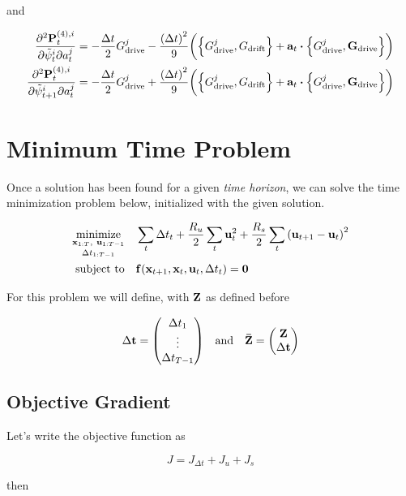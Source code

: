 \documentclass{article}
\newcommand{\isopsi}{\tilde \psi}
\begin{document}
and 

\begin{align}
  \pdv{\vb{P}_t^{(4), i}}{\isopsi_t^i}{a^j_t} &= -\frac{\Delta t}{2} G^j_{\text{drive}} - \frac{\qty(\Delta t)^2}{9}\bigg( \qty{G^j_{\text{drive}}, G_{\text{drift}}} + \vb{a}_t \vdot \qty{G^j_{\text{drive}}, \vb{G}_{\text{drive}}} \bigg)\\
  \pdv{\vb{P}_t^{(4), i}}{\isopsi_{t+1}^i}{a^j_t} &= -\frac{\Delta t}{2} G^j_{\text{drive}} + \frac{\qty(\Delta t)^2}{9}\bigg( \qty{G^j_{\text{drive}}, G_{\text{drift}}} + \vb{a}_t \vdot \qty{G^j_{\text{drive}}, \vb{G}_{\text{drive}}} \bigg)
\end{align}

\section{Minimum Time Problem}

Once a solution has been found for a given \textit{time horizon}, we can solve the time minimization problem below, initialized with the given solution.

\begin{align*}
  \underset{\Delta t_{1:T-1}}{\underset{\vb{x}_{1:T}, \ \vb{u}_{1:T-1}}{\text{minimize}}} & 
  \quad \sum_t \Delta t_t + \frac{R_u}{2} \sum_t \vb{u}_t^2 + \frac{R_s}{2} \sum_t \qty(\vb{u}_{t+1} - \vb{u}_t)^2\\
  \text{subject to} & \quad \vb{f}(\vb{x}_{t+1}, \vb{x}_t, \vb{u}_t, \Delta t_t) = \vb{0}\\
\end{align*}

For this problem we will define, with $\vb{Z}$ as defined before 

$$
  \Delta \vb{t} = \mqty(
    \Delta t_1 \\ 
    \vdots \\ 
    \Delta t_{T-1}
  )
  \quad \text{and} \quad
  \vb{\bar Z} = \mqty(\vb{Z} \\ \Delta \vb{t})
$$


\subsection{Objective Gradient}

Let's write the objective function as 

\begin{equation}
  J = J_{\Delta t} + J_u + J_s
\end{equation}

then
\end{document}
